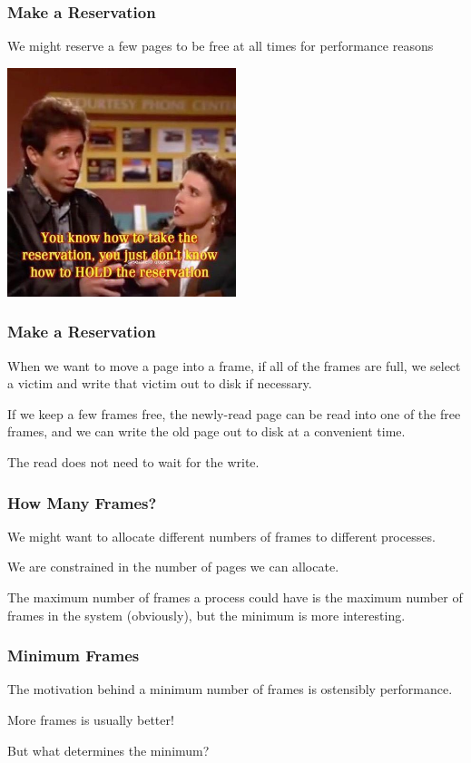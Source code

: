 \begin{frame}
\frametitle{Make a Reservation}

We might reserve a few pages to be free at all times for performance reasons

\begin{center}
	\includegraphics[width=0.5\textwidth]{images/reservation.jpg}
\end{center}

\end{frame}

\begin{frame}
\frametitle{Make a Reservation}

When we want to move a page into a frame, if all of the frames are full, we select a victim and write that victim out to disk if necessary. 

If we keep a few frames free, the newly-read page can be read into one of the free frames, and we can write the old page out to disk at a convenient time. 

The read does not need to wait for the write.

\end{frame}

\begin{frame}
\frametitle{How Many Frames?}

We might want to allocate different numbers of frames to different processes.

We are constrained in the number of pages we can allocate. 

The maximum number of frames a process could have is the maximum number of frames in the system (obviously), but the minimum is more interesting.


\end{frame}

\begin{frame}
\frametitle{Minimum Frames}

The motivation behind a minimum number of frames is ostensibly performance. 

More frames is usually better!

But what determines the minimum?

\end{frame}

